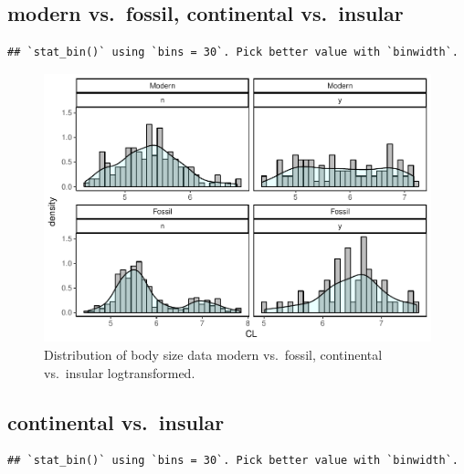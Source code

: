 \documentclass[]{article}
\begin{document}
\newpage

\subsection{modern vs.~fossil, continental
vs.~insular}\label{modern-vs.fossil-continental-vs.insular}

\begin{verbatim}
## `stat_bin()` using `bins = 30`. Pick better value with `binwidth`.
\end{verbatim}

\begin{figure}[htbp]
\centering
\includegraphics{MA_JJ_files/figure-latex/HistFMCI-1.pdf}
\caption{Distribution of body size data modern vs.~fossil, continental
vs.~insular logtransformed.}
\end{figure}

\newpage

\subsection{continental vs.~insular}\label{continental-vs.insular}

\begin{verbatim}
## `stat_bin()` using `bins = 30`. Pick better value with `binwidth`.
\end{verbatim}
\end{document}
